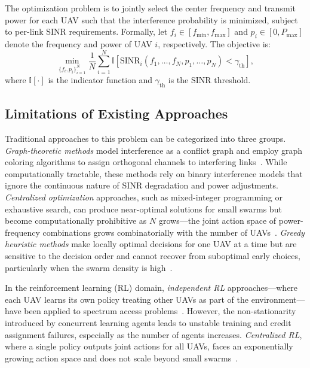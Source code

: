 \documentclass[conference]{IEEEtran}
\begin{document}
The optimization problem is to jointly select the center frequency and transmit power for each UAV such that the interference probability is minimized, subject to per-link SINR requirements. Formally, let $f_i \in [f_{\min}, f_{\max}]$ and $p_i \in [0, P_{\max}]$ denote the frequency and power of UAV $i$, respectively. The objective is:
\begin{equation}
\min_{\{f_i, p_i\}_{i=1}^{N}} \frac{1}{N} \sum_{i=1}^{N} \mathbb{I} \left[ \text{SINR}_i(f_1, \ldots, f_N, p_1, \ldots, p_N) < \gamma_{\text{th}} \right],
\end{equation}
where $\mathbb{I}[\cdot]$ is the indicator function and $\gamma_{\text{th}}$ is the SINR threshold.

\subsection{Limitations of Existing Approaches}

Traditional approaches to this problem can be categorized into three groups. \emph{Graph-theoretic methods} model interference as a conflict graph and employ graph coloring algorithms to assign orthogonal channels to interfering links~\cite{ref_graph_coloring1,ref_graph_coloring2}. While computationally tractable, these methods rely on binary interference models that ignore the continuous nature of SINR degradation and power adjustments. \emph{Centralized optimization} approaches, such as mixed-integer programming or exhaustive search, can produce near-optimal solutions for small swarms but become computationally prohibitive as $N$ grows---the joint action space of power-frequency combinations grows combinatorially with the number of UAVs~\cite{ref_central_opt1}. \emph{Greedy heuristic methods} make locally optimal decisions for one UAV at a time but are sensitive to the decision order and cannot recover from suboptimal early choices, particularly when the swarm density is high~\cite{ref_greedy1}.

In the reinforcement learning (RL) domain, \emph{independent RL} approaches---where each UAV learns its own policy treating other UAVs as part of the environment---have been applied to spectrum access problems~\cite{ref_independent_rl1,ref_independent_rl2}. However, the non-stationarity introduced by concurrent learning agents leads to unstable training and credit assignment failures, especially as the number of agents increases. \emph{Centralized RL}, where a single policy outputs joint actions for all UAVs, faces an exponentially growing action space and does not scale beyond small swarms~\cite{ref_centralized_rl1}.
\end{document}
